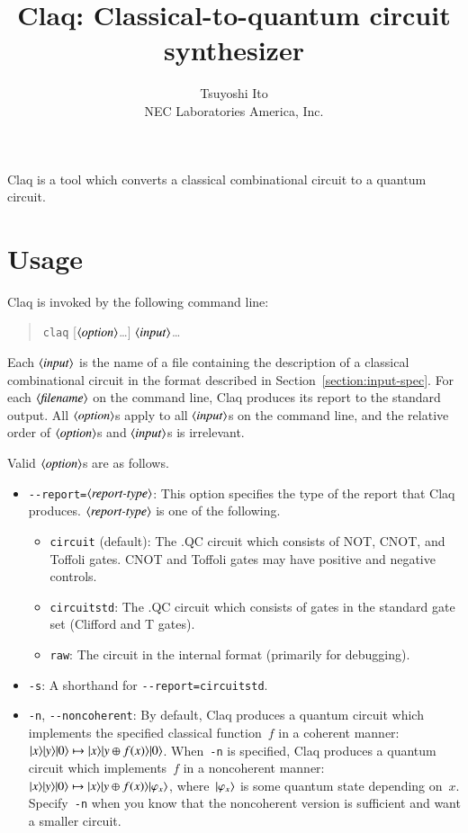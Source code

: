 \documentclass[letterpaper,11pt]{article}
\title{Claq: Classical-to-quantum circuit synthesizer}
\author{Tsuyoshi Ito \\
  NEC Laboratories America, Inc.}
\date{}
\DeclarePairedDelimiter{\ket}{\lvert}{\rangle}
\newcommand{\param}[1]{\ensuremath{\langle\text{\textit{#1}}\rangle}}
\begin{document}
\maketitle

Claq is a tool which converts a classical combinational circuit to a quantum circuit.

\section{Usage}

Claq is invoked by the following command line:
\begin{quote}
\texttt{claq} [\param{option}\ldots] \param{input}\ldots
\end{quote}

Each \param{input} is the name of a file containing the description
of a classical combinational circuit in the format described
in Section~\ref{section:input-spec}.
For each \param{filename} on the command line,
Claq produces its report to the standard output.
All \param{option}s apply to all \param{input}s on the command line,
and the relative order of \param{option}s and \param{input}s is irrelevant.

Valid \param{option}s are as follows.
\begin{itemize}
\item
  \texttt{-{-}report=}\param{report-type}:
  This option specifies the type of the report that Claq produces.
  \param{report-type} is one of the following.
  \begin{itemize}
  \item
    \texttt{circuit} (default):
    The .QC circuit which consists of
    NOT, CNOT, and Toffoli gates.
    CNOT and Toffoli gates may have positive and negative controls.
  \item
    \texttt{circuitstd}:
    The .QC circuit which consists of
    gates in the standard gate set (Clifford and T gates).
  \item
    \texttt{raw}:
    The circuit in the internal format
    (primarily for debugging).
  \end{itemize}
\item
  \texttt{-s}:
  A shorthand for \texttt{-{-}report=circuitstd}.
\item
  \texttt{-n}, \texttt{-{-}noncoherent}:
  By default, Claq produces a quantum circuit
  which implements the specified classical function~$f$ in a coherent manner:
  $\ket{x}\ket{y}\ket{0}\mapsto\ket{x}\ket{y\oplus f(x)}\ket{0}$.
  When~\texttt{-n} is specified,
  Claq produces a quantum circuit
  which implements~$f$ in a noncoherent manner:
  $\ket{x}\ket{y}\ket{0}\mapsto\ket{x}\ket{y\oplus f(x)}\ket{\varphi_x}$,
  where~$\ket{\varphi_x}$ is some quantum state depending on~$x$.
  Specify~\texttt{-n} when you know that the noncoherent version is sufficient
  and want a smaller circuit.
\end{itemize}
\end{document}
